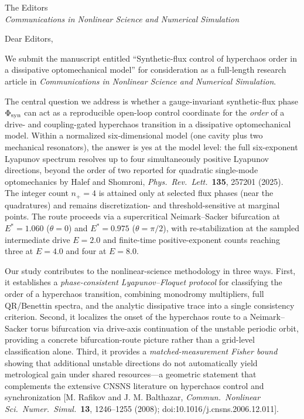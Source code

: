 \documentclass[11pt,a4paper]{letter}
\date{\today}
\begin{document}
\begin{letter}{The Editors\\\textit{Communications in Nonlinear Science and Numerical Simulation}}
\opening{Dear Editors,}

We submit the manuscript entitled ``Synthetic-flux control of hyperchaos order in a dissipative optomechanical model'' for consideration as a full-length research article in \textit{Communications in Nonlinear Science and Numerical Simulation}.

The central question we address is whether a gauge-invariant synthetic-flux phase $\Phi_{\rm syn}$ can act as a reproducible open-loop control coordinate for the \emph{order} of a drive- and coupling-gated hyperchaos transition in a dissipative optomechanical model. Within a normalized six-dimensional model (one cavity plus two mechanical resonators), the answer is yes at the model level: the full six-exponent Lyapunov spectrum resolves up to four simultaneously positive Lyapunov directions, beyond the order of two reported for quadratic single-mode optomechanics by Halef and Shomroni, \textit{Phys.\ Rev.\ Lett.}\ \textbf{135}, 257201 (2025). The integer count $n_+=4$ is attained only at selected flux phases (near the quadratures) and remains discretization- and threshold-sensitive at marginal points. The route proceeds via a supercritical Neimark--Sacker bifurcation at $E^{*}=\num{1.060}$ ($\theta=0$) and $E^{*}=\num{0.975}$ ($\theta=\pi/2$), with re-stabilization at the sampled intermediate drive $E=\num{2.0}$ and finite-time positive-exponent counts reaching three at $E=\num{4.0}$ and four at $E=\num{8.0}$.

Our study contributes to the nonlinear-science methodology in three ways. First, it establishes a \emph{phase-consistent Lyapunov--Floquet protocol} for classifying the order of a hyperchaos transition, combining monodromy multipliers, full QR/Benettin spectra, and the analytic dissipative trace into a single consistency criterion. Second, it localizes the onset of the hyperchaos route to a Neimark--Sacker torus bifurcation via drive-axis continuation of the unstable periodic orbit, providing a concrete bifurcation-route picture rather than a grid-level classification alone. Third, it provides a \emph{matched-measurement Fisher bound} showing that additional unstable directions do not automatically yield metrological gain under shared resources---a geometric statement that complements the extensive CNSNS literature on hyperchaos control and synchronization [M. Rafikov and J. M. Balthazar, \textit{Commun.\ Nonlinear Sci.\ Numer.\ Simul.}\ \textbf{13}, 1246--1255 (2008); doi:10.1016/j.cnsns.2006.12.011].


\end{letter}
\end{document}
